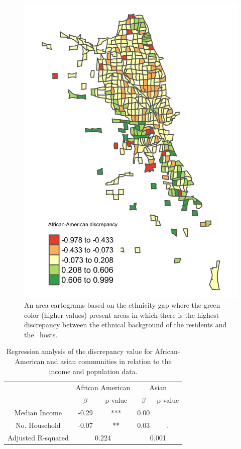 \begin{figure}[htbp]
\begin{center}
\includegraphics[scale=0.25]{pics/black-gap.png}

\caption{ An area cartograms based on the ethnicity gap where the green color (higher values) present areas in which there is the highest discrepancy between the ethnical background of the residents and the \ab \  hosts. }
\label{fig:gap}
\end{center}
\end{figure}

 
   \begin{table}
        \centering

        \begin{tabular}{c|c c|c c}
             & \multicolumn{2}{c}{African American } &  \multicolumn{2}{c}{Asian }\\
              \cline{2-5}
             & $\beta$ & p-value &  $\beta$ & p-value\\
           \hline
            \hline
              Median Income & -0.29 & *** & 0.00 &   \\
            No. Household & -0.07 & **  & 0.03 & . \\
            \hline
            \hline
            Adjusted R-squared    & \multicolumn{2}{c|}{ 0.224} &  \multicolumn{2}{c}{ 0.001}\\

        \end{tabular}
\caption{Regression analysis of the discrepancy value for African-American and asian communities in relation to the income and population data.  }
\label{tab:reg}
    \end{table}


